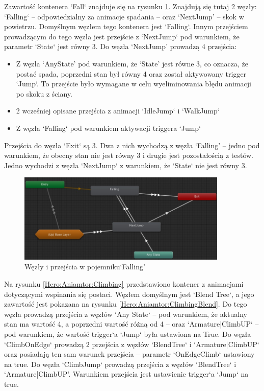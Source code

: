 \documentclass[12pt,twoside]{article}
\begin{document}
\linebreak
\linebreak
\linebreak
\linebreak
Zawartość kontenera `Fall` znajduje się na rysunku \ref{Hero:Aniamtor:Falling}.
Znajdują się tutaj 2 węzły: `Falling` -- odpowiedzialny za animacje spadania –
oraz ‘NextJump’ -- skok w powietrzu. Domyślnym węzłem tego kontenera jest
`Falling`. Innym przejściem prowadzącym do tego węzła jest przejście z
`NextJump` pod warunkiem, że parametr `State` jest równy 3. Do węzła ‘NextJump’
prowadzą 4 przejścia: 
\begin{itemize}
\item Z węzła `AnyState' pod warunkiem, że ‘State’ jest równe 3, co oznacza, że
postać spada, poprzedni stan był równy 4 oraz został aktywowany trigger `Jump`.
To przejście było wymagane w celu wyeliminowania błędu animacji po skoku z
ściany.
\item 2 wcześniej opisane przejścia z animacji `IdleJump` i `WalkJump`
\item Z węzła `Falling` pod warunkiem aktywacji triggera `Jump`
\end{itemize} 
Przejścia do węzła `Exit` są 3. Dwa z nich wychodzą z węzła ‘Falling’ -- jedno
pod warunkiem, że obecny stan nie jest równy 3 i drugie jest pozostałością z
testów. Jedno wychodzi z węzła `NextJump` z warunkiem, że `State` nie jest równy
3. 
\begin{figure}[!ht]
    \centering
	\includegraphics[width=10cm]{RealizacjaProjektu/UnityPictires/Animator/Player1_Animator_Falling.jpg}
	\caption{Węzły i przejścia w pojemniku`Falling'}
    \label{Hero:Aniamtor:Falling}
\end{figure}

Na rysunku \ref{Hero:Aniamtor:Climbing} przedstawiono kontener z animacjami
dotyczącymi wspinania się postaci. Węzłem domyślnym jest `Blend Tree`, a jego
zawartość jest pokazana na rysunku \ref{Hero:Aniamtor:ClimbingBlend}. Do tego
węzła prowadzą przejścia z węzłów `Any State` --  pod warunkiem, że aktualny stan
ma wartość 4, a poprzedni wartość różną od 4 -- oraz `Armature|ClimbUP` -- pod
warunkiem, że wartość trigger`a `Jump` była ustawiona na True. Do węzła
`ClimbOnEdge` prowadzą 2 przejścia z węzłów `BlendTree` i `Armature|ClimbUP`
oraz posiadają ten sam warunek przejścia -- parametr `OnEdgeClimb` ustawiony na
true. Do węzła `ClimbJump` prowadzą przejścia z węzłów `BlendTree` i
`Armature|ClimbUP’. Warunkiem przejścia jest ustawienie trigger`a `Jump` na
true. 
\end{document}
